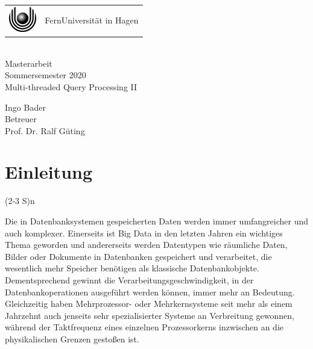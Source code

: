 \documentclass[a4paper,12pt,twoside]{article}
\newcommand{\Theme}{Multi-threaded Query Processing II}
\newcommand{\Name}{Ingo Bader}
\begin{document}
\thispagestyle{empty}
\pagestyle{empty}

\begin{center}
\begin{huge}
\vspace*{3cm}
    \begin{tabular}{m{1.2cm}@{\ \ }m{9cm}}
      \includegraphics[width=1.2cm]{logo.eps} & {FernUniversität in Hagen}
    \end{tabular}
    \\
    \vspace*{3cm}
   Masterarbeit \\
   Sommersemester 2020 \\[2em]
   \glqq{} \Theme \grqq{} \\[2cm]
\end{huge}
\begin{large}
	\Name \\[3cm]
   	Betreuer \\[1em]
   	Prof. Dr. Ralf Güting 
\end{large}
\end{center}

\clearpage
\tableofcontents
\clearpage
\raggedbottom
\thispagestyle{fancy}
\pagestyle{fancy}
\setcounter{page}{1}

\section{Einleitung} (2-3 S)n

Die in Datenbanksystemen gespeicherten Daten werden immer umfangreicher und auch komplexer. Einerseits ist Big Data in den letzten Jahren ein wichtiges Thema geworden und andererseits werden Datentypen wie räumliche Daten, Bilder oder Dokumente in Datenbanken gespeichert und verarbeitet, die wesentlich mehr Speicher benötigen als klassische Datenbankobjekte. Dementsprechend gewinnt die Verarbeitungsgeschwindigkeit, in der Datenbankoperationen ausgeführt werden können, immer mehr an Bedeutung. Gleichzeitig haben Mehrprozessor- oder Mehrkernsysteme seit mehr als einem Jahrzehnt auch jenseits sehr spezialisierter Systeme an Verbreitung gewonnen, während der Taktfrequenz eines einzelnen Prozessorkerns inzwischen an die physikalischen Grenzen gestoßen ist.
\end{document}
